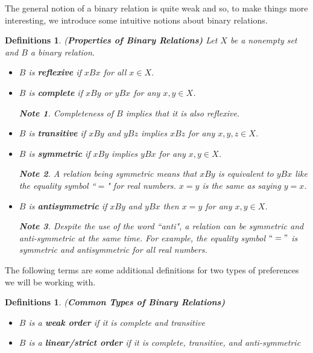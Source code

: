 \documentclass[12pt]{article}
\newtheorem{undefin}[defin]{Definitions}
\newtheorem*{note}{Note}
\newcommand{\tn}[1]{\textnormal{#1}}
\newcommand{\name}[1]{\tn{(\textbf{#1)}}}
\newcommand{\3}{\vspace*{3mm}}
\begin{document}
The general notion of a binary relation is quite weak and so, to make things more interesting, we introduce some intuitive notions about binary relations.

\begin{undefin} \name{Properties of Binary Relations}
\tn{Let $X$ be a nonempty set and $B$ a binary relation.}
\begin{itemize}
\item \tn{$B$ is \textbf{reflexive} if $x B x$ for all $x \in X$. }
\item \tn{$B$ is \textbf{complete} if $x B y$ or $y B x $ for any $x, y \in X$.}
\begin{note}
\tn{Completeness of $B$ implies that it is also reflexive.}
\end{note}
\item \tn{$B$ is \textbf{transitive} if $x B y$ and $y B z$ implies $x B z$ for any $x,y,z \in X$.}
\item \tn{$B$ is \textbf{symmetric} if $x B y $ implies $y B x$ for any $x, y \in X$.}
\begin{note}
\tn{A relation being symmetric means that $x B y$ is equivalent to $ y B x$ like the equality symbol ``$=$" for real numbers. $x = y$ is the same as saying $y = x$.}
\end{note}
\item \tn{$B$ is \textbf{antisymmetric} if $x B y $ and $y B x$ then $ x = y$ for any $x,y \in X$. }
\begin{note}
\tn{Despite the use of the word ``anti", a relation can be symmetric and anti-symmetric at the same time. For example, the equality symbol $``="$ is symmetric and antisymmetric for all real numbers. 
}
\end{note}
\end{itemize}
\end{undefin}

The following terms are some additional definitions for two types of preferences we will be working with.

\begin{undefin} \name{Common Types of Binary Relations}
\
\begin{itemize}
\item \tn{$B$ is a \textbf{weak order} if it is complete and transitive}
\item \tn{$B$ is a \textbf{linear/strict order} if it is complete, transitive, and anti-symmetric}
\end{itemize}
\end{undefin}
\end{document}
